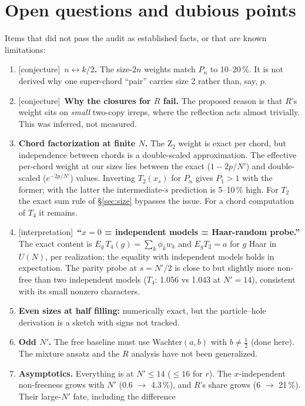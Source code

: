 \documentclass[11pt]{article}
\newcommand{\Np}{N'}
\newcommand{\tagbox}[2]{\textsf{\small\color{#1}[#2]}}
\newcommand{\CONJ}{\tagbox{cconj}{conjecture}}
\newcommand{\INTERP}{\tagbox{cconj}{interpretation}}
\theoremstyle{remark}
\begin{document}
\section{Open questions and dubious points}\label{sec:open}
Items that did not pass the audit as established facts, or that are known limitations:
\begin{enumerate}\itemsep2pt
\item \CONJ\ \textbf{$n\leftrightarrow k/2$.} The size-$2n$ weights match $P_n$ to 10--20\,\%. It is not derived why
  one super-chord ``pair'' carries size 2 rather than, say, $p$.
\item \CONJ\ \textbf{Why the closures for $R$ fail.} The proposed reason is that $R$'s weight sits on \emph{small}
  two-copy irreps, where the reflection acts almost trivially. This was inferred, not measured.
\item \textbf{Chord factorization at finite $N$.} The Z$_2$ weight is exact per chord, but independence between chords
  is a double-scaled approximation. The effective per-chord weight at our sizes lies between the exact
  ($1-2p/\Np$) and double-scaled ($e^{-2p/\Np}$) values. Inverting $T_2(x_s)$ for $P_n$ gives $P_1>1$ with the
  former; with the latter the intermediate-$s$ prediction is 5--10\,\% high. For $T_2$ the exact sum rule of \S\ref{sec:size}
  bypasses the issue. For a chord computation of $T_4$ it remains.
\item \INTERP\ \textbf{``$x=0$ = independent models = Haar-random probe.''} The exact content is
  $E_g\,T_4(g)=\sum_k\phi_kw_k$ and $E_gT_2=a$ for $g$ Haar in $U(N)$, per realization; the equality with independent
  models holds in expectation. The parity probe at $s=\Np/2$ is close to but slightly more non-free than two
  independent models ($T_4$: 1.056 vs 1.043 at $\Np=14$), consistent with its small nonzero characters.
\item \textbf{Even sizes at half filling:} numerically exact, but the particle--hole derivation is a sketch with signs
  not tracked.
\item \textbf{Odd $\Np$.} The free baseline must use Wachter$(a,b)$ with $b\neq\frac12$ (done here). The mixture ansatz
  and the $R$ analysis have not been generalized.
\item \textbf{Asymptotics.} Everything is at $\Np\le14$ ($\le16$ for $r$). The $x$-independent non-freeness grows with
  $\Np$ (0.6 $\to$ 4.3\,\%), and $R$'s share grows (6 $\to$ 21\,\%). Their large-$\Np$ fate, including the difference

\end{enumerate}
\end{document}
